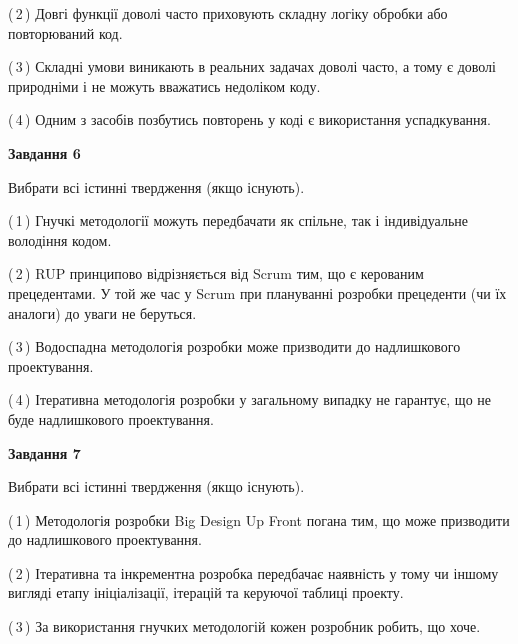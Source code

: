 \documentclass[10pt, ukrainian]{article}
\begin{document}
{\begin {large}
(\,2\,) Довгі функції доволі часто приховують складну логіку обробки або повторюваний код. %



(\,3\,) Складні умови виникають в реальних задачах доволі часто, а тому є доволі природніми і не можуть вважатись недоліком коду. %



(\,4\,) Одним з засобів позбутись повторень у коді є використання успадкування. %

\newpage

{\begin {center}\textbf{Завдання 6}\end {center}}\par
Вибрати всі істинні твердження (якщо існують).\par
\vspace{2mm}



(\,1\,) Гнучкі методології можуть передбачати як спільне, так і індивідуальне володіння кодом. %



(\,2\,) RUP принципово відрізняється від Scrum тим, що є керованим прецедентами. У той же час у Scrum при плануванні розробки прецеденти (чи їх аналоги) до уваги не беруться. %



(\,3\,) Водоспадна методологія розробки може призводити до надлишкового проектування. %



(\,4\,) Ітеративна методологія розробки у загальному випадку не гарантує, що не буде надлишкового проектування. %


{\begin {center}\textbf{Завдання 7}\end {center}}\par
Вибрати всі істинні твердження (якщо існують).\par
\vspace{2mm}



(\,1\,) Методологія розробки Big Design Up Front погана тим, що може призводити до надлишкового проектування. %



(\,2\,) Ітеративна та інкрементна розробка передбачає наявність у тому чи іншому вигляді етапу ініціалізації, ітерацій та керуючої таблиці проекту. %



(\,3\,) За використання гнучких методологій кожен розробник робить, що хоче. %




\end{large}}
\end{document}
